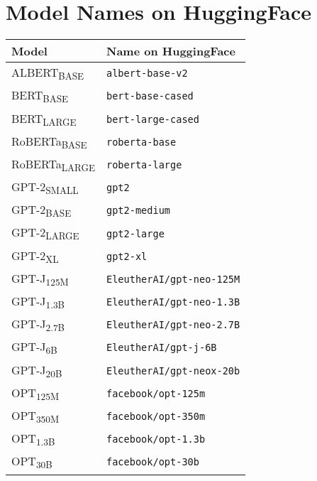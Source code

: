 \documentclass[3p]{elsarticle}
\begin{document}
{ 


\clearpage
\appendix

\section{Model Names on HuggingFace}
\label{app:relbert:hf-name}

\begin{table}[ht]
\centering
\begin{tabular}{ll}
\toprule
Model &        Name on HuggingFace \\
\midrule
ALBERT\textsubscript{BASE}      &            \texttt{albert-base-v2} \\
BERT\textsubscript{BASE}        &            \texttt{bert-base-cased} \\
BERT\textsubscript{LARGE}       &           \texttt{bert-large-cased} \\
RoBERTa\textsubscript{BASE}     &               \texttt{roberta-base} \\
RoBERTa\textsubscript{LARGE}    &              \texttt{roberta-large} \\
GPT-2\textsubscript{SMALL}      &                       \texttt{gpt2} \\
GPT-2\textsubscript{BASE}       &                \texttt{gpt2-medium} \\
GPT-2\textsubscript{LARGE}      &                 \texttt{gpt2-large} \\
GPT-2\textsubscript{XL}       &                    \texttt{gpt2-xl} \\
GPT-J\textsubscript{125M}       &    \texttt{EleutherAI/gpt-neo-125M} \\
GPT-J\textsubscript{1.3B}       &    \texttt{EleutherAI/gpt-neo-1.3B} \\
GPT-J\textsubscript{2.7B}       &    \texttt{EleutherAI/gpt-neo-2.7B} \\
GPT-J\textsubscript{6B}         &        \texttt{EleutherAI/gpt-j-6B} \\
GPT-J\textsubscript{20B}        &    \texttt{EleutherAI/gpt-neox-20b} \\
OPT\textsubscript{125M}         &          \texttt{facebook/opt-125m} \\
OPT\textsubscript{350M}         &          \texttt{facebook/opt-350m} \\
OPT\textsubscript{1.3B}         &          \texttt{facebook/opt-1.3b} \\
OPT\textsubscript{30B}          &           \texttt{facebook/opt-30b} \\

\end{tabular}
\end{table}}
\end{document}
